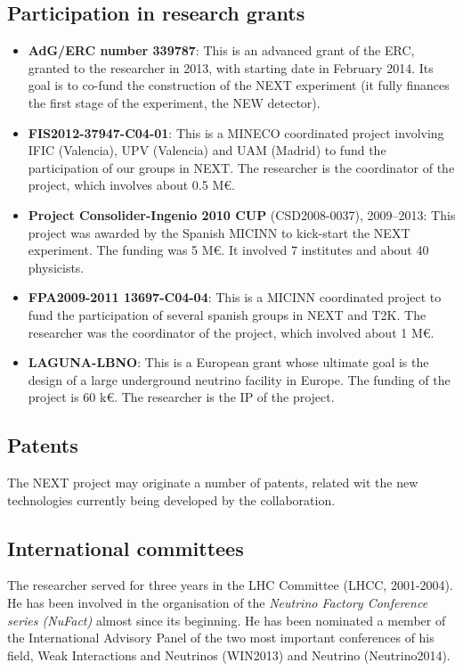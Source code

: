\documentclass[a4paper,11pt,oneside]{article}
\begin{document}
\subsection{Participation in research grants}
\begin{itemize}

\item {\bf AdG/ERC number 339787}: This is an advanced grant of the ERC, granted to the researcher in 2013, with starting date in February 2014. Its goal is to co-fund the construction of the NEXT experiment (it fully finances the first stage of the experiment, the NEW detector). 
% 
\item {\bf FIS2012-37947-C04-01}: This is a MINECO coordinated project involving IFIC (Valencia),  UPV (Valencia) and UAM (Madrid) to fund the participation of our groups in NEXT. The researcher is the coordinator of the project, which involves about 0.5 M\euro.
\item {\bf Project Consolider-Ingenio 2010 CUP} (CSD2008-0037), 2009--2013: This project was awarded by the Spanish MICINN to kick-start the NEXT experiment. The funding was 5 M\euro. It involved 7 institutes and about 40 physicists. 
\item {\bf FPA2009-2011 13697-C04-04}: This is a MICINN coordinated project to fund the participation of several spanish groups in NEXT and T2K. The researcher was the coordinator of the project, which involved about 1 M\euro.
\item {\bf LAGUNA-LBNO}: This is a European grant whose ultimate goal is the design of a large underground neutrino facility in Europe. The funding of the project is 60 k\euro. The researcher is the IP of the project. 
\end{itemize}
%
\subsection{Patents}
The NEXT project may originate a number of patents, related wit the new technologies currently being developed by the collaboration.

\subsection{International committees}
%
The researcher served for three years in the LHC Committee (LHCC, 2001-2004). He has been involved in the organisation of the \textit{Neutrino Factory Conference series (NuFact)} almost since its beginning. He has been nominated a member of the International Advisory Panel of the two most important conferences of his field, Weak Interactions and Neutrinos (WIN2013) and Neutrino (Neutrino2014). 
\end{document}
